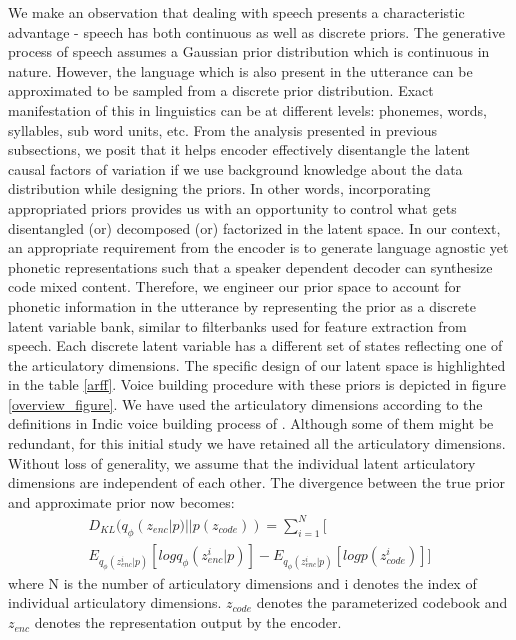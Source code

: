 We make an observation that dealing with speech presents a characteristic advantage - speech has both continuous as well as discrete priors. The generative process of speech assumes a Gaussian prior distribution which is continuous in nature. However, the language which is also present in the utterance can be approximated to be sampled from a discrete prior distribution. Exact manifestation of this in linguistics can be at different levels: phonemes, words, syllables, sub word units, etc. From the analysis presented in previous subsections, we posit that it helps encoder effectively disentangle the latent causal factors of variation if we use background knowledge about the data distribution while designing the priors. In other words, incorporating appropriated priors provides us with an opportunity to control what gets disentangled (or) decomposed (or) factorized in the latent space. In our context, an appropriate requirement from the encoder is to generate language agnostic yet phonetic representations such that a speaker dependent decoder can synthesize code mixed content. Therefore, we engineer our prior space to account for phonetic information in the utterance by representing the prior as a discrete latent variable bank, similar to filterbanks used for feature extraction from speech. Each discrete latent variable has a different set of states reflecting one of the articulatory dimensions. The specific design of our latent space is highlighted in the table \ref{arff}. Voice building procedure with these priors is depicted in figure \ref{overview_figure}. We have used the articulatory dimensions according to the definitions in Indic voice building process of \cite{black2006clustergen}. Although some of them might be redundant, for this initial study we have retained all the articulatory dimensions. Without loss of generality, we assume that the individual latent articulatory dimensions are independent of each other. The divergence between the true prior and approximate prior now becomes:
\begin{equation*}
\begin{multlined}
D_{KL}(q_{\phi}(z_{enc}|p) || p(z_{code})) = \sum_{i=1}^{N}[\\ 
E_{q_{\phi}(z_{enc}^{i}|p)}[log  q_{\phi}(z_{enc}^{i}|p)] - E_{q_{\phi}(z_{enc}^{i}|p)}[log p(z_{code}^{i})] ]
\end{multlined}
\end{equation*}
where N is the number of articulatory dimensions and i denotes the index of individual articulatory dimensions. $z_{code}$ denotes the parameterized codebook and $z_{enc}$ denotes the representation output by the encoder. 



